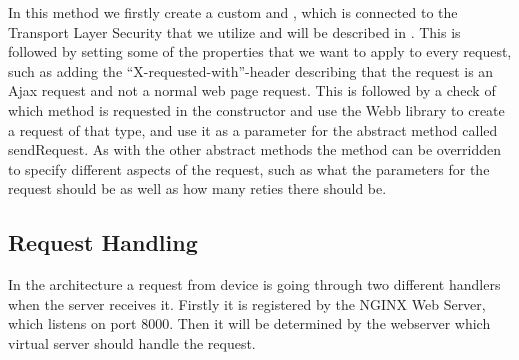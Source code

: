 

In this method we firstly create a custom  and , which is connected to the Transport Layer Security that we utilize and will be described in . This is followed by setting some of the properties that we want to apply to every request, such as adding the ``X-requested-with''-header describing that the request is an Ajax request and not a normal web page request. This is followed by a check of which method is requested in the constructor and use the Webb library to create a request of that type, and use it as a parameter for the abstract method called sendRequest. As with the other abstract methods the  method can be overridden to specify different aspects of the request, such as what the parameters for the request should be as well as how many reties there should be.

\subsection{Request Handling}
\label{sub:request_handling}

In the architecture a request from device is going through two different handlers when the server receives it. Firstly it is registered by the NGINX Web Server, which listens on port 8000. Then it will be determined by the webserver which virtual server should handle the request. 



